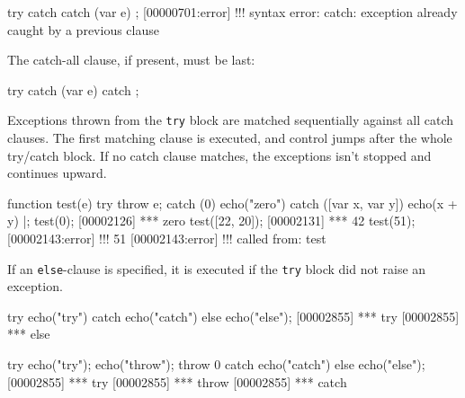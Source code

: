 \begin{urbiscript}
try {} catch {} catch (var e) {};
[00000701:error] !!! syntax error: catch: exception already caught by a previous clause
\end{urbiscript}

\noindent
The catch-all clause, if present, must be last:

\begin{urbiscript}
try {} catch (var e) {} catch {};
\end{urbiscript}

Exceptions thrown from the \lstinline|try| block are matched sequentially
against all catch clauses. The first matching clause is executed, and
control jumps after the whole try/catch block. If no catch clause matches,
the exceptions isn't stopped and continues upward.

\begin{urbiscript}
function test(e)
{
  try
  { throw e;  }
  catch (0)
  { echo("zero") }
  catch ([var x, var y])
  { echo(x + y) }
}|;
test(0);
[00002126] *** zero
test([22, 20]);
[00002131] *** 42
test(51);
[00002143:error] !!! 51
[00002143:error] !!!    called from: test
\end{urbiscript}

If an \lstinline|else|-clause is specified, it is executed if the
\lstinline|try| block did not raise an exception.

\begin{urbiscript}
try   { echo("try") }
catch { echo("catch")}
else  { echo("else")};
[00002855] *** try
[00002855] *** else

try   { echo("try"); echo("throw"); throw 0 }
catch { echo("catch")}
else  { echo("else")};
[00002855] *** try
[00002855] *** throw
[00002855] *** catch
\end{urbiscript}

